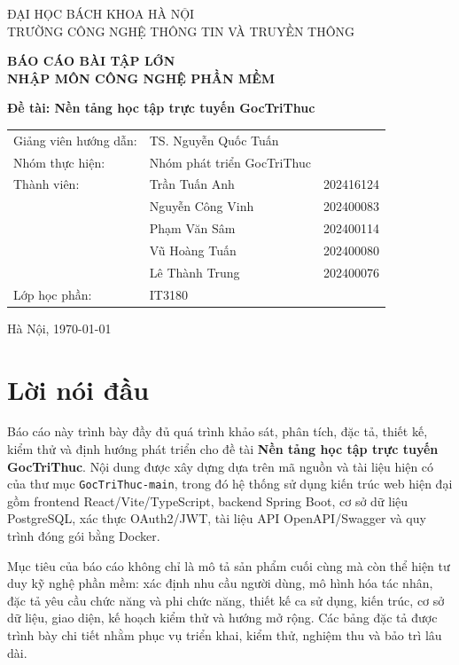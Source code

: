\documentclass[12pt,a4paper]{report}
\newcommand{\projectname}{GocTriThuc}
\newcommand{\topic}{Nền tảng học tập trực tuyến GocTriThuc}
\begin{document}
\begin{titlepage}
\centering
{\Large ĐẠI HỌC BÁCH KHOA HÀ NỘI\\[4pt] TRƯỜNG CÔNG NGHỆ THÔNG TIN VÀ TRUYỀN THÔNG}\par
\vspace{2.5cm}
{\Huge\bfseries BÁO CÁO BÀI TẬP LỚN\\[8pt] NHẬP MÔN CÔNG NGHỆ PHẦN MỀM}\par
\vspace{1.2cm}
{\LARGE\bfseries\selectfont Đề tài: \topic\par}
\vspace{2cm}
\begin{tabular}{lll}
Giảng viên hướng dẫn: & TS. Nguyễn Quốc Tuấn &  \\
Nhóm thực hiện: & Nhóm phát triển \projectname & \\
Thành viên: & Trần Tuấn Anh & 202416124 \\
& Nguyễn Công Vinh & 202400083 \\ 
& Phạm Văn Sâm & 202400114 \\
& Vũ Hoàng Tuấn &  202400080 \\
& Lê Thành Trung & 202400076 \\
Lớp học phần: & IT3180 & \\
\end{tabular}
\vfill
{\large Hà Nội, \today}
\end{titlepage}

\tableofcontents
\listoftables
\listoffigures
\clearpage

\chapter*{Lời nói đầu}
Báo cáo này trình bày đầy đủ quá trình khảo sát, phân tích, đặc tả, thiết kế, kiểm thử và định hướng phát triển cho đề tài \textbf{\topic}. Nội dung được xây dựng dựa trên mã nguồn và tài liệu hiện có của thư mục \texttt{GocTriThuc-main}, trong đó hệ thống sử dụng kiến trúc web hiện đại gồm frontend React/Vite/TypeScript, backend Spring Boot, cơ sở dữ liệu PostgreSQL, xác thực OAuth2/JWT, tài liệu API OpenAPI/Swagger và quy trình đóng gói bằng Docker.

Mục tiêu của báo cáo không chỉ là mô tả sản phẩm cuối cùng mà còn thể hiện tư duy kỹ nghệ phần mềm: xác định nhu cầu người dùng, mô hình hóa tác nhân, đặc tả yêu cầu chức năng và phi chức năng, thiết kế ca sử dụng, kiến trúc, cơ sở dữ liệu, giao diện, kế hoạch kiểm thử và hướng mở rộng. Các bảng đặc tả được trình bày chi tiết nhằm phục vụ triển khai, kiểm thử, nghiệm thu và bảo trì lâu dài.
\end{document}
